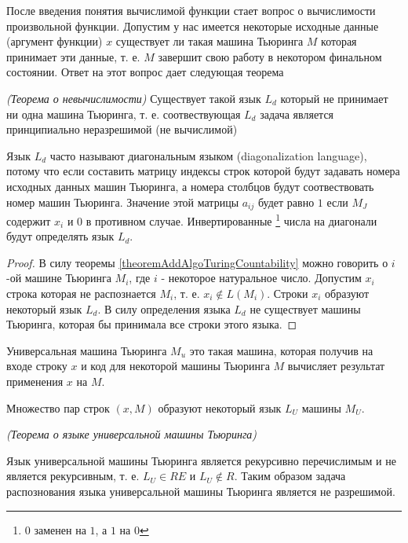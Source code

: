 После введения понятия вычислимой функции стает вопрос о вычислимости
произвольной функции. Допустим у нас имеется некоторые исходные данные
(аргумент функции) $x$ существует ли такая машина Тьюринга $M$ которая
принимает эти данные, т. е. $M$ завершит свою работу в некотором
финальном состоянии. Ответ на этот вопрос дает следующая теорема

\begin{theorem}
\emph{(Теорема о невычислимости)}
Существует такой язык $L_d$ который не принимает ни одна машина
Тьюринга, т. е. соотвествующая $L_d$ задача является принципиально
неразрешимой (не вычислимой) 
\label{theoremAddAlgoTuringLdUndecidability}
\end{theorem}

Язык $L_d$ часто называют диагональным языком (diagonalization
language), потому что если составить матрицу 
\cite{bUllman2006} индексы строк которой
будут задавать номера исходных данных машин Тьюринга, а номера
столбцов будут соотвествовать номер машин Тьюринга. Значение этой
матрицы $a_{ij}$ будет равно $1$ если $M_J$ содержит $x_i$ и $0$ в
противном случае. Инвертированные \footnote{ $0$ заменен на $1$, а $1$
на $0$} числа на диагонали будут определять язык $L_d$.

\begin{proof}
В силу теоремы \ref{theoremAddAlgoTuringCountability} можно говорить о
$i$-ой машине Тьюринга $M_i$, где $i$ - некоторое натуральное
число. Допустим $x_i$ строка которая не распознается $M_i$, т. е. 
$x_i \notin L\left(M_i\right)$. Строки $x_i$ образуют некоторый язык
$L_d$. В силу определения языка $L_d$ не существует машины Тьюринга,
которая бы принимала все строки этого языка.
\end{proof}

\begin{definition}
Универсальная машина Тьюринга $M_u$ это такая машина, которая получив
на входе строку $x$ и код для некоторой машины Тьюринга $M$ вычисляет
результат применения $x$ на $M$.
\end{definition}



Множество пар строк $\left(x, M\right)$ образуют некоторый язык $L_U$ машины
$M_U$. 



\begin{theorem}
\emph{(Теорема о языке универсальной машины Тьюринга)}

Язык универсальной машины Тьюринга является рекурсивно перечислимым и
не является рекурсивным, т. е. $L_U \in RE$ и $L_U \notin R$. Таким
образом задача распознования языка универсальной машины Тьюринга
является не разрешимой.
\label{theoremAddAlgoTuringUniversalMachine}
\end{theorem}

